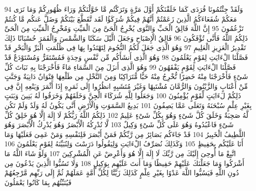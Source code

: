 \documentclass[20pt,a4paper]{article}
\begin{document}
{\tiny\colorbox{cl_aya}{94}} وَلَقَدْ جِئْتُمُونَا فُرَدَى كَمَا خَلَقْنَكُمْ أَوَّلَ مَرَّةٍ وَتَرَكْتُم مَّا خَوَّلْنَكُمْ وَرَاءَ ظُهُورِكُمْ وَمَا نَرَى مَعَكُمْ شُفَعَاءَكُمُ الَّذِينَ زَعَمْتُمْ أَنَّهُمْ فِيكُمْ شُرَكَؤُا لَقَد تَّقَطَّعَ بَيْنَكُمْ وَضَلَّ عَنكُم مَّا كُنتُمْ تَزْعُمُونَ
{\tiny\colorbox{cl_aya}{95}} إِنَّ اللَّهَ فَالِقُ الْحَبِّ وَالنَّوَى يُخْرِجُ الْحَىَّ مِنَ الْمَيِّتِ وَمُخْرِجُ الْمَيِّتِ مِنَ الْحَىِّ ذَلِكُمُ اللَّهُ فَأَنَّى تُؤْفَكُونَ
{\tiny\colorbox{cl_aya}{96}} فَالِقُ الْإِصْبَاحِ وَجَعَلَ الَّيْلَ سَكَنًا وَالشَّمْسَ وَالْقَمَرَ حُسْبَانًا ذَلِكَ تَقْدِيرُ الْعَزِيزِ الْعَلِيمِ
{\tiny\colorbox{cl_aya}{97}} وَهُوَ الَّذِى جَعَلَ لَكُمُ النُّجُومَ لِتَهْتَدُوا بِهَا فِى ظُلُمَتِ الْبَرِّ وَالْبَحْرِ قَدْ فَصَّلْنَا الْءَايَتِ لِقَوْمٍ يَعْلَمُونَ
{\tiny\colorbox{cl_aya}{98}} وَهُوَ الَّذِى أَنشَأَكُم مِّن نَّفْسٍ وَحِدَةٍ فَمُسْتَقَرٌّ وَمُسْتَوْدَعٌ قَدْ فَصَّلْنَا الْءَايَتِ لِقَوْمٍ يَفْقَهُونَ
{\tiny\colorbox{cl_aya}{99}} وَهُوَ الَّذِى أَنزَلَ مِنَ السَّمَاءِ مَاءً فَأَخْرَجْنَا بِهِ نَبَاتَ كُلِّ شَىْءٍ فَأَخْرَجْنَا مِنْهُ خَضِرًا نُّخْرِجُ مِنْهُ حَبًّا مُّتَرَاكِبًا وَمِنَ النَّخْلِ مِن طَلْعِهَا قِنْوَانٌ دَانِيَةٌ وَجَنَّتٍ مِّنْ أَعْنَابٍ وَالزَّيْتُونَ وَالرُّمَّانَ مُشْتَبِهًا وَغَيْرَ مُتَشَبِهٍ انظُرُوا إِلَى ثَمَرِهِ إِذَا أَثْمَرَ وَيَنْعِهِ إِنَّ فِى ذَلِكُمْ لَءَايَتٍ لِّقَوْمٍ يُؤْمِنُونَ
{\tiny\colorbox{cl_aya}{100}} وَجَعَلُوا لِلَّهِ شُرَكَاءَ الْجِنَّ وَخَلَقَهُمْ وَخَرَقُوا لَهُ بَنِينَ وَبَنَتٍ بِغَيْرِ عِلْمٍ سُبْحَنَهُ وَتَعَلَى عَمَّا يَصِفُونَ
{\tiny\colorbox{cl_aya}{101}} بَدِيعُ السَّمَوَتِ وَالْأَرْضِ أَنَّى يَكُونُ لَهُ وَلَدٌ وَلَمْ تَكُن لَّهُ صَحِبَةٌ وَخَلَقَ كُلَّ شَىْءٍ وَهُوَ بِكُلِّ شَىْءٍ عَلِيمٌ
{\tiny\colorbox{cl_aya}{102}} ذَلِكُمُ اللَّهُ رَبُّكُمْ لَا إِلَهَ إِلَّا هُوَ خَلِقُ كُلِّ شَىْءٍ فَاعْبُدُوهُ وَهُوَ عَلَى كُلِّ شَىْءٍ وَكِيلٌ
{\tiny\colorbox{cl_aya}{103}} لَّا تُدْرِكُهُ الْأَبْصَرُ وَهُوَ يُدْرِكُ الْأَبْصَرَ وَهُوَ اللَّطِيفُ الْخَبِيرُ
{\tiny\colorbox{cl_aya}{104}} قَدْ جَاءَكُم بَصَائِرُ مِن رَّبِّكُمْ فَمَنْ أَبْصَرَ فَلِنَفْسِهِ وَمَنْ عَمِىَ فَعَلَيْهَا وَمَا أَنَا عَلَيْكُم بِحَفِيظٍ
{\tiny\colorbox{cl_aya}{105}} وَكَذَلِكَ نُصَرِّفُ الْءَايَتِ وَلِيَقُولُوا دَرَسْتَ وَلِنُبَيِّنَهُ لِقَوْمٍ يَعْلَمُونَ
{\tiny\colorbox{cl_aya}{106}} اتَّبِعْ مَا أُوحِىَ إِلَيْكَ مِن رَّبِّكَ لَا إِلَهَ إِلَّا هُوَ وَأَعْرِضْ عَنِ الْمُشْرِكِينَ
{\tiny\colorbox{cl_aya}{107}} وَلَوْ شَاءَ اللَّهُ مَا أَشْرَكُوا وَمَا جَعَلْنَكَ عَلَيْهِمْ حَفِيظًا وَمَا أَنتَ عَلَيْهِم بِوَكِيلٍ
{\tiny\colorbox{cl_aya}{108}} وَلَا تَسُبُّوا الَّذِينَ يَدْعُونَ مِن دُونِ اللَّهِ فَيَسُبُّوا اللَّهَ عَدْوًا بِغَيْرِ عِلْمٍ كَذَلِكَ زَيَّنَّا لِكُلِّ أُمَّةٍ عَمَلَهُمْ ثُمَّ إِلَى رَبِّهِم مَّرْجِعُهُمْ فَيُنَبِّئُهُم بِمَا كَانُوا يَعْمَلُونَ
\end{document}
